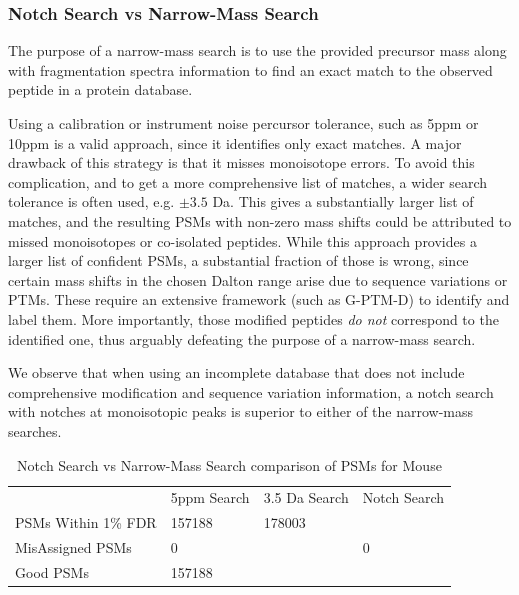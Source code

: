 \documentclass[journal=jprobs,manuscript=article]{achemso}
\begin{document}
\subsubsection{Notch Search vs Narrow-Mass Search}

The purpose of a narrow-mass search is to use the provided precursor mass along with fragmentation spectra information to find an exact match to the observed peptide in a protein database.

Using a calibration or instrument noise percursor tolerance, such as 5ppm or 10ppm is a valid approach, since it identifies only exact matches.
A major drawback of this strategy is that it misses monoisotope errors.
To avoid this complication, and to get a more comprehensive list of matches, a wider search tolerance is often used, e.g. $\pm 3.5$ Da.
This gives a substantially larger list of matches, and the resulting PSMs with non-zero mass shifts could be attributed to missed monoisotopes or co-isolated peptides.
While this approach provides a larger list of confident PSMs, a substantial fraction of those is wrong, since certain mass shifts in the chosen Dalton range arise due to sequence variations or PTMs.
These require an extensive framework (such as G-PTM-D) to identify and label them.
More importantly, those modified peptides \textit{do not} correspond to the identified one, thus arguably defeating the purpose of a narrow-mass search. 

We observe that when using an incomplete database that does not include comprehensive modification and sequence variation information, a notch search with notches at monoisotopic peaks is superior to either of the narrow-mass searches.

\begin{table}[]
\centering
\caption{Notch Search vs Narrow-Mass Search comparison of PSMs for Mouse}
\label{my-label}
\begin{tabular}{@{}llll@{}}
                    & 5ppm Search & 3.5 Da Search & Notch Search \\ \cmidrule(l){2-4}
PSMs Within 1\% FDR & 157188      & 178003        &        \\
MisAssigned PSMs    & 0           &               & 0            \\
Good PSMs           & 157188      &         &        \\ 
\end{tabular}
\end{table}
\end{document}
